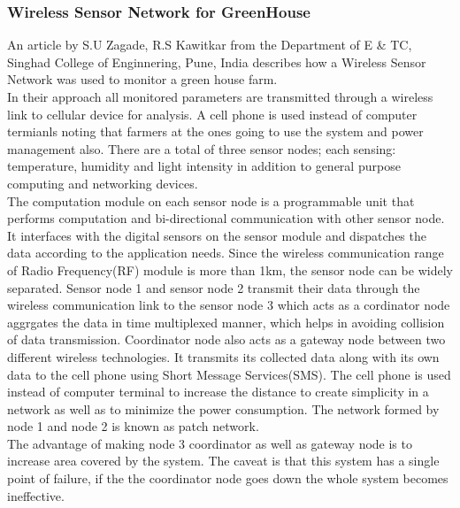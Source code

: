\documentclass[12pt, a4paper]{article}
\begin{document}
\subsubsection{Wireless Sensor Network for GreenHouse}
An article by S.U Zagade, R.S Kawitkar \cite{zagade2012wireless} from the Department of E \& TC, Singhad College of Enginnering, Pune, India describes how a Wireless Sensor Network was used to monitor a green house farm.\\
In their approach all monitored parameters are transmitted through a  wireless link to cellular device for analysis. A cell phone is used instead of computer termianls noting that farmers at the ones going to use the system and power management also. There are a total of three sensor nodes; each sensing: temperature, humidity and light intensity in addition to general purpose computing and networking devices.\\
The computation module on each sensor node is a programmable unit that performs computation and bi-directional communication with other sensor node. It interfaces with the digital sensors on the sensor module and dispatches the data according to the application needs. Since the wireless communication range of Radio Frequency(RF) module is more than 1km, the sensor node can be widely separated. Sensor node 1 and sensor node 2 transmit their data through the wireless communication link to the sensor node 3 which acts as a  cordinator node aggrgates the data in time multiplexed manner, which helps in avoiding collision of data transmission. Coordinator node also acts as a gateway node between two different wireless technologies. It transmits its collected data along with its own data to the cell phone using Short Message Services(SMS). The cell phone is used instead of computer terminal to increase the distance to create simplicity in a network as well as to minimize the power consumption. The network formed by node 1 and node 2 is known as patch network.\\
The advantage of making node 3 coordinator as well as gateway node is to increase area covered by the system. The caveat is that this system has a single point of failure, if the the coordinator node goes down the whole system becomes ineffective.  
\end{document}
